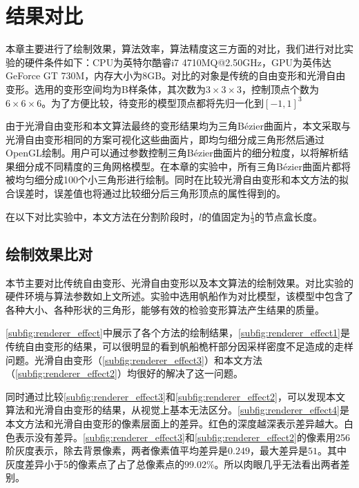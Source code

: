 \chapter{结果对比}
本章主要进行了绘制效果，算法效率，算法精度这三方面的对比，我们进行对比实验的硬件条件如下：CPU为英特尔酷睿i7 4710MQ@2.50GHz，GPU为英伟达GeForce GT 730M，内存大小为8GB。对比的对象是传统的自由变形\cite{Sederberg86}和光滑自由变形\cite{Cui15}。选用的变形空间均为B样条体，其次数为$3\times3\times3$，控制顶点个数为$6\times6\times6$。为了方便比较，待变形的模型顶点都将先归一化到$[-1, 1]^3$

由于光滑自由变形和本文算法最终的变形结果均为三角Bézier曲面片，本文采取与光滑自由变形相同的方案可视化这些曲面片，即均匀细分成三角形然后通过OpenGL绘制。用户可以通过参数控制三角Bézier曲面片的细分粒度，以将解析结果细分成不同精度的三角网格模型。在本章的实验中，所有三角Bézier曲面片都将被均匀细分成100个小三角形进行绘制。同时在比较光滑自由变形和本文方法的拟合误差时，误差值也将通过比较细分后三角形顶点的属性得到的。

在以下对比实验中，本文方法在分割阶段时，$l$的值固定为$\frac{1}{3}$的节点盒长度。

\section{绘制效果比对}
本节主要对比传统自由变形、光滑自由变形以及本文算法的绘制效果。对比实验的硬件环境与算法参数如上文所述。实验中选用帆船作为对比模型，该模型中包含了各种大小、各种形状的三角形，能够有效的检验变形算法产生结果的质量。

\autoref{subfig:renderer_effect}中展示了各个方法的绘制结果，\autoref{subfig:renderer_effect1}是传统自由变形的结果，可以很明显的看到帆船桅杆部分因采样密度不足造成的走样问题。光滑自由变形（\autoref{subfig:renderer_effect3}）和本文方法（\autoref{subfig:renderer_effect2}）均很好的解决了这一问题。

同时通过比较\autoref{subfig:renderer_effect3}和\autoref{subfig:renderer_effect2}，可以发现本文算法和光滑自由变形的结果，从视觉上基本无法区分。\autoref{subfig:renderer_effect4}是本文方法和光滑自由变形的像素层面上的差异。红色的深度越深表示差异越大。白色表示没有差异。\autoref{subfig:renderer_effect3}和\autoref{subfig:renderer_effect2}的像素用256阶灰度表示，除去背景像素，两者像素值平均差异是$0.249$，最大差异是$51$。其中灰度差异小于5的像素点了占了总像素点的$99.02\%$。所以肉眼几乎无法看出两者差别。

